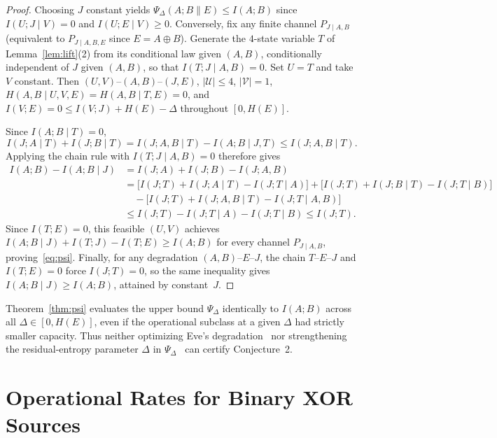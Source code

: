\documentclass[11pt]{article}
\theoremstyle{plain}
\theoremstyle{definition}
\theoremstyle{remark}
\newcommand{\mkv}{\text{--}}
\begin{document}
\begin{proof}
Choosing $J$ constant yields $\Psi_\Delta(A; B \| E) \le I(A; B)$ since $I(U; J \mid V) = 0$ and $I(U; E \mid V) \ge 0$.
Conversely, fix any finite channel $P_{J \mid A, B}$ (equivalent to $P_{J \mid A, B, E}$ since $E = A \oplus B$).
Generate the $4$-state variable $T$ of Lemma~\ref{lem:lift}(2) from its conditional law given $(A, B)$, conditionally independent of $J$ given $(A, B)$, so that $I(T; J \mid A, B) = 0$.
Set $U = T$ and take $V$ constant.
Then $(U, V) \mkv (A, B) \mkv (J, E)$, $|\mathcal{U}| \le 4$, $|\mathcal{V}| = 1$, $H(A, B \mid U, V, E) = H(A, B \mid T, E) = 0$, and $I(V; E) = 0 \le I(V; J) + H(E) - \Delta$ throughout $[0, H(E)]$.

Since $I(A; B \mid T) = 0$,
\[
I(J; A \mid T) + I(J; B \mid T) = I(J; A, B \mid T) - I(A; B \mid J, T) \le I(J; A, B \mid T).
\]
Applying the chain rule with $I(T; J \mid A, B) = 0$ therefore gives
\begin{align*}
I(A; B) - I(A; B \mid J)
&= I(J; A) + I(J; B) - I(J; A, B) \\
&= \bigl[I(J; T) + I(J; A \mid T) - I(J; T \mid A)\bigr] + \bigl[I(J; T) + I(J; B \mid T) - I(J; T \mid B)\bigr] \\
&\quad - \bigl[I(J; T) + I(J; A, B \mid T) - I(J; T \mid A, B)\bigr] \\
&\le I(J; T) - I(J; T \mid A) - I(J; T \mid B) \le I(J; T).
\end{align*}
Since $I(T; E) = 0$, this feasible $(U, V)$ achieves $I(A; B \mid J) + I(T; J) - I(T; E) \ge I(A; B)$ for every channel $P_{J \mid A, B}$, proving~\eqref{eq:psi}.
Finally, for any degradation $(A, B) \mkv E \mkv J$, the chain $T \mkv E \mkv J$ and $I(T; E) = 0$ force $I(J; T) = 0$, so the same inequality gives $I(A; B \mid J) \ge I(A; B)$, attained by constant~$J$.
\end{proof}

Theorem~\ref{thm:psi} evaluates the upper bound $\Psi_\Delta$ identically to $I(A; B)$ across all $\Delta \in [0, H(E)]$, even if the operational subclass at a given $\Delta$ had strictly smaller capacity.
Thus neither optimizing Eve's degradation~\cite{MaurerWolf1999} nor strengthening the residual-entropy parameter $\Delta$ in $\Psi_\Delta$~\cite{GohariAnantharam2010,AbinGohari2026} can certify Conjecture~2.

\section{Operational Rates for Binary XOR Sources}
\end{document}

